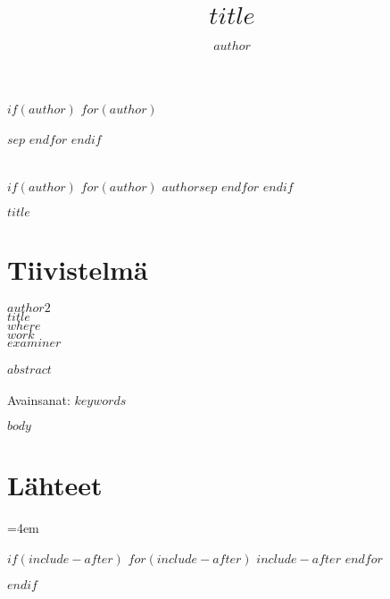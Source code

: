 \documentclass[a4paper,12pt,utf8]{report}
\begin{document}

\title{$title$}

$if(author)$
$for(author)$
\author{$author$}$sep$
$endfor$
$endif$

\begin{titlepage}%

\begin{center}%
\vspace*{191pt} \ \\
$if(author)$
$for(author)$
$author$$sep$
$endfor$
$endif$
\\
\end{center}
\begin{center}
    \bfseries
    \fontsize{16}{20}
    \selectfont
    \uppercase{
        $title$
    }
    \\
\end{center}


\clearpage
\end{titlepage}%

\chapter*{Tiivistelmä}
$author2$ \\
$title$ \\
$where$ \\
$work$ \\
$examiner$ \\
\\
\noindent
$abstract$
\\
\\
\noindent
Avainsanat: $keywords$
\thispagestyle{empty} %
\clearpage



\tableofcontents
\thispagestyle{empty} %

$body$

\chapter{Lähteet}

\emergencystretch=4em %
\printbibliography[heading=none]

\appendix
$if(include-after)$
$for(include-after)$
$include-after$
$endfor$

$endif$
\end{document}
